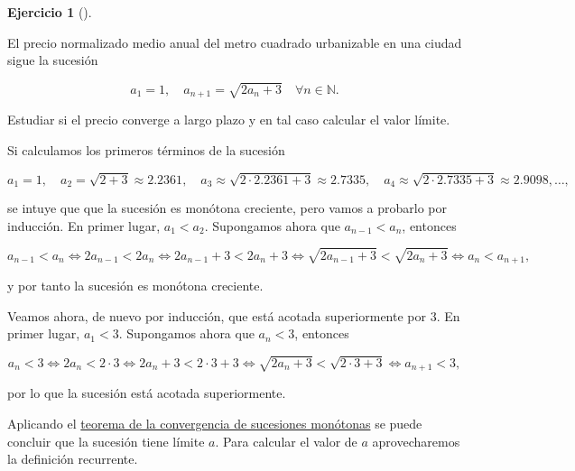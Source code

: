 \documentclass[
  spanish,
  a4paper,
]{scrreport}
\theoremstyle{definition}
\newtheorem{exercise}{Ejercicio}[chapter]
\theoremstyle{remark}
\begin{document}
\begin{exercise}[]\protect\hypertarget{exr-2}{}\label{exr-2}

El precio normalizado medio anual del metro cuadrado urbanizable en una
ciudad sigue la sucesión

\[
a_1 = 1, \quad a_{n+1} = \sqrt{2a_n+3}\quad \forall n \in \mathbb{N}.
\]

Estudiar si el precio converge a largo plazo y en tal caso calcular el
valor límite.

\end{exercise}

\begin{tcolorbox}[enhanced jigsaw, arc=.35mm, bottomrule=.15mm, bottomtitle=1mm, breakable, colback=white, colbacktitle=quarto-callout-tip-color!10!white, colframe=quarto-callout-tip-color-frame, coltitle=black, left=2mm, leftrule=.75mm, opacityback=0, opacitybacktitle=0.6, rightrule=.15mm, title=\textcolor{quarto-callout-tip-color}{\faLightbulb}\hspace{0.5em}{Solución}, titlerule=0mm, toprule=.15mm, toptitle=1mm]

Si calculamos los primeros términos de la sucesión

\[
a_1 = 1, \quad a_2 = \sqrt{2+3} \approx 2.2361, \quad a_3 \approx \sqrt{2\cdot 2.2361+3} \approx 2.7335, \quad  a_4 \approx \sqrt{2\cdot 2.7335+3} \approx 2.9098, \ldots,
\]

se intuye que que la sucesión es monótona creciente, pero vamos a
probarlo por inducción. En primer lugar, \(a_1<a_2\). Supongamos ahora
que \(a_{n-1}<a_n\), entonces

\[
a_{n-1}<a_n
\Leftrightarrow 2a_{n-1}<2a_n
\Leftrightarrow 2a_{n-1}+3<2a_n+3
\Leftrightarrow \sqrt{2a_{n-1}+3}<\sqrt{2a_n+3}
\Leftrightarrow a_n<a_{n+1},
\]

y por tanto la sucesión es monótona creciente.

Veamos ahora, de nuevo por inducción, que está acotada superiormente por
\(3\). En primer lugar, \(a_1<3\). Supongamos ahora que \(a_n<3\),
entonces

\[
a_n<3 
\Leftrightarrow 2a_n<2\cdot 3
\Leftrightarrow 2a_n+3<2\cdot 3 +3
\Leftrightarrow \sqrt{2a_n+3}<\sqrt{2\cdot 3 +3}
\Leftrightarrow a_{n+1} < 3,
\]

por lo que la sucesión está acotada superiormente.

Aplicando el
\href{https://aprendeconalf.es/analisis-manual/04-sucesiones.html\#thm-convergencia-monotona}{teorema
de la convergencia de sucesiones monótonas} se puede concluir que la
sucesión tiene límite \(a\). Para calcular el valor de \(a\)
aprovecharemos la definición recurrente.


\end{tcolorbox}
\end{document}
